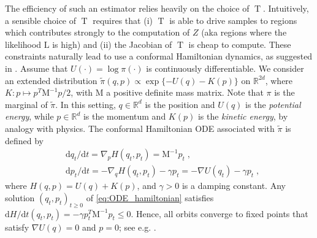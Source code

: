 \documentclass{article}
\def\mass{\mathrm{M}}
\def\transfo{\operatorname{T}}
\def\rmd{\operatorname{d}\hspace{-2pt}}
\def\rset{\mathbb{R}}
\def\rmd{\mathrm{d}}
\def\eqsp{\,}
\def\eqsp{\;}
\newcommand{\1}{\mathds{1}}
\def\rset{\mathbb{R}}
\def\rmd{\mathrm{d}}
\def\likelihood{\mathrm{L}}
\begin{document}
The efficiency of such an estimator relies heavily on the choice of $\transfo$. Intuitively, a sensible choice of
$\transfo$ requires that  (i) $\transfo$ is able to drive samples to regions which contributes strongly to the computation of $Z$ (aka regions where the likelihood $\likelihood$ is high) and (ii) the Jacobian of $\transfo$ is cheap to compute. These constraints naturally lead to use a  conformal Hamiltonian dynamics, as suggested in
\cite{rotskoff:vanden-eijden:2019}.  Assume that $U(\cdot) = \log \pi(\cdot)$ is continuously differentiable. We consider an extended distribution $\tilde\pi(q,p) \propto \exp \{-U(q)-K(p)\}$
on  $\rset^{2d}$, where $K:p\mapsto p^T\mass^{-1} p/2$, with $\mass$ a positive definite mass matrix. Note that $\pi$ is the marginal of $\tilde{\pi}$. In this setting, $q\in \rset^d$ is the position and $U(q)$ is the {\em potential energy}, while $p\in \rset^d$ is the momentum and $K(p)$ is the {\em kinetic energy}, by analogy with physics. The conformal Hamiltonian ODE associated with $\tilde \pi$ is defined by 
\begin{align}
  \label{eq:ODE_hamiltonian}
  &\rmd{q_t}/\rmd t =\nabla_{p} H(q_t,p_t) = \mass^{-1} p_t \eqsp, \\
  \nonumber
&\rmd {p}_t/\rmd t =-\nabla_{q} H(q_t,p_t)-\gamma p_t = -\nabla U(q_t) - \gamma p_t \eqsp,
\end{align}
where $H(q,p)= U(q)+ K(p)$, and $\gamma >0$ is a damping constant. Any solution $(q_t,p_t)_{t \geq 0}$ of \eqref{eq:ODE_hamiltonian} satisfies $\rmd {H}/\rmd t (q_t,p_t) = - \gamma p_t^T\mass^{-1} p_t\leq 0$. Hence, all orbits converge to fixed points that satisfy $\nabla U(q)=0$ and $p=0$; see e.g. \cite{francca2019conformal,maddison2018hamiltonian}.
\end{document}

